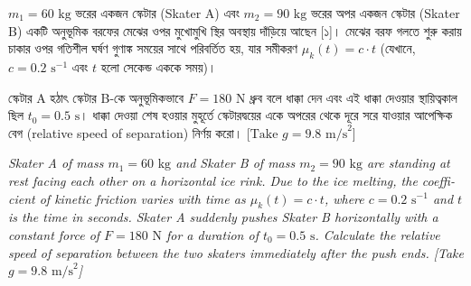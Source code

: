 \documentclass[12pt, a4paper]{article}
\begin{document}
\begin{tcolorbox}[questionbox={প্রশ্ন (Question) 14}]
\noindent
$m_1 = 60\text{ kg}$ ভরের একজন স্কেটার (Skater A) এবং $m_2 = 90\text{ kg}$ ভরের অপর একজন স্কেটার (Skater B) একটি অনুভূমিক বরফের মেঝের ওপর মুখোমুখি স্থির অবস্থায় দাঁড়িয়ে আছেন [১]। মেঝের বরফ গলতে শুরু করায় চাকার ওপর গতিশীল ঘর্ষণ গুণাঙ্ক সময়ের সাথে পরিবর্তিত হয়, যার সমীকরণ $\mu_k(t) = c \cdot t$ (যেখানে, $c = 0.2\text{ s}^{-1}$ এবং $t$ হলো সেকেন্ড এককে সময়)। 

\vspace{0.3em}
\noindent
স্কেটার A হঠাৎ স্কেটার B-কে অনুভূমিকভাবে $F = 180\text{ N}$ ধ্রুব বলে ধাক্কা দেন এবং এই ধাক্কা দেওয়ার স্থায়িত্বকাল ছিল $t_0 = 0.5\text{ s}$। ধাক্কা দেওয়া শেষ হওয়ার মুহূর্তে স্কেটারদ্বয়ের একে অপরের থেকে দূরে সরে যাওয়ার আপেক্ষিক বেগ (relative speed of separation) নির্ণয় করো। [$\text{Take } g = 9.8\text{ m/s}^2$]

\vspace{0.8em}
\begin{english}
\noindent\textit{\color{darkgray}
Skater A of mass $m_1 = 60\text{ kg}$ and Skater B of mass $m_2 = 90\text{ kg}$ are standing at rest facing each other on a horizontal ice rink. Due to the ice melting, the coefficient of kinetic friction varies with time as $\mu_k(t) = c \cdot t$, where $c = 0.2\text{ s}^{-1}$ and $t$ is the time in seconds. Skater A suddenly pushes Skater B horizontally with a constant force of $F = 180\text{ N}$ for a duration of $t_0 = 0.5\text{ s}$. Calculate the relative speed of separation between the two skaters immediately after the push ends. [Take $g = 9.8\text{ m/s}^2$]
}
\end{english}
\end{tcolorbox}
\end{document}

